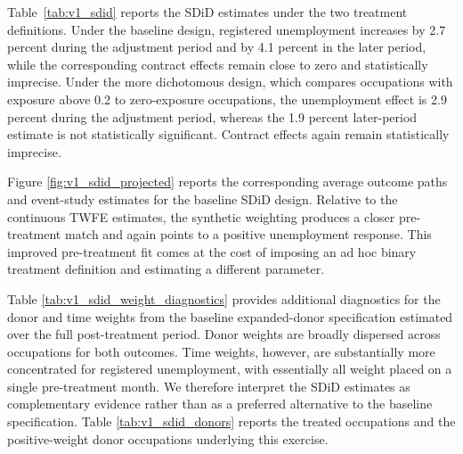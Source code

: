 Table~\ref{tab:v1_sdid} reports the SDiD estimates under the two treatment definitions. Under the baseline design, registered unemployment increases by 2.7 percent during the adjustment period and by 4.1 percent in the later period, while the corresponding contract effects remain close to zero and statistically imprecise. Under the more dichotomous design, which compares occupations with exposure above 0.2 to zero-exposure occupations, the unemployment effect is 2.9 percent during the adjustment period, whereas the 1.9 percent later-period estimate is not statistically significant. Contract effects again remain statistically imprecise.

Figure \ref{fig:v1_sdid_projected} reports the corresponding average outcome paths and event-study estimates for the baseline SDiD design. Relative to the continuous TWFE estimates, the synthetic weighting produces a closer pre-treatment match and again points to a positive unemployment response. This improved pre-treatment fit comes at the cost of imposing an ad hoc binary treatment definition and estimating a different parameter.

Table \ref{tab:v1_sdid_weight_diagnostics} provides additional diagnostics for the donor and time weights from the baseline expanded-donor specification estimated over the full post-treatment period. Donor weights are broadly dispersed across occupations for both outcomes. Time weights, however, are substantially more concentrated for registered unemployment, with essentially all weight placed on a single pre-treatment month. We therefore interpret the SDiD estimates as complementary evidence rather than as a preferred alternative to the baseline specification. Table \ref{tab:v1_sdid_donors} reports the treated occupations and the positive-weight donor occupations underlying this exercise.




